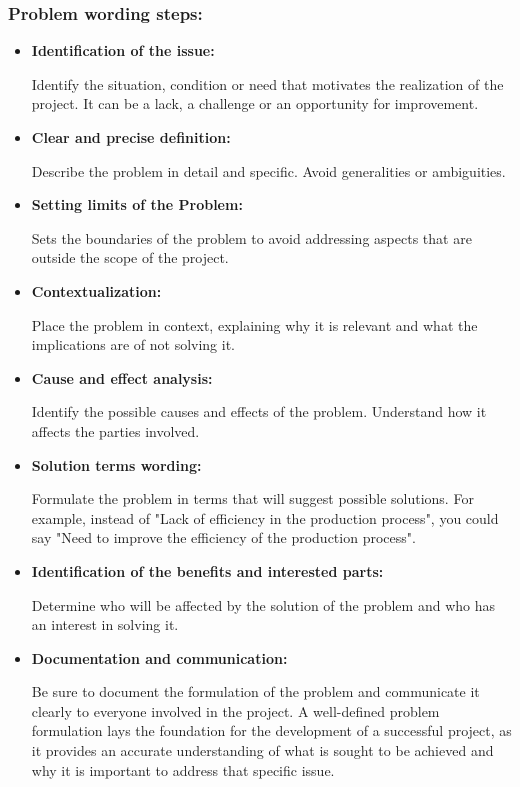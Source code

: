 \documentclass{article}
\begin{document}
\subsubsection{Problem wording steps:}
\begin{itemize}
	\item
	      \textbf{Identification of the issue:}
	      \par Identify the situation, condition or need that motivates the
	      realization of the project. It can be a lack, a challenge or an
	      opportunity for improvement.
	\item
	      \textbf{Clear and precise definition:}
	      \par Describe the problem in detail and specific. Avoid generalities or
	      ambiguities.
	\item
	      \textbf{Setting limits of the Problem:}
	      \par Sets the boundaries of the problem to avoid addressing aspects that
	      are outside the scope of the project.
	\item
	      \textbf{Contextualization:}
	      \par Place the problem in context, explaining why it is relevant and
	      what the implications are of not solving it.
	\item
	      \textbf{Cause and effect analysis:}
	      \par Identify the possible causes and effects of the problem. Understand
	      how it affects the parties involved.
	\item
	      \textbf{Solution terms wording:}
	      \par Formulate the problem in terms that will suggest possible
	      solutions. For example, instead of "Lack of efficiency in the
	      production process", you could say "Need to improve the efficiency of
	      the production process".
	\item
	      \textbf{Identification of the benefits and interested parts:}
	      \par Determine who will be affected by the solution of the problem and
	      who has an interest in solving it.

	\item
	      \textbf{Documentation and communication:}
	      \par Be sure to document the formulation of the problem and communicate
	      it clearly to everyone involved in the project. A well-defined problem
	      formulation lays the foundation for the development of a successful
	      project, as it provides an accurate understanding of what is sought to
	      be achieved and why it is important to address that specific issue.
\end{itemize}
\end{document}
